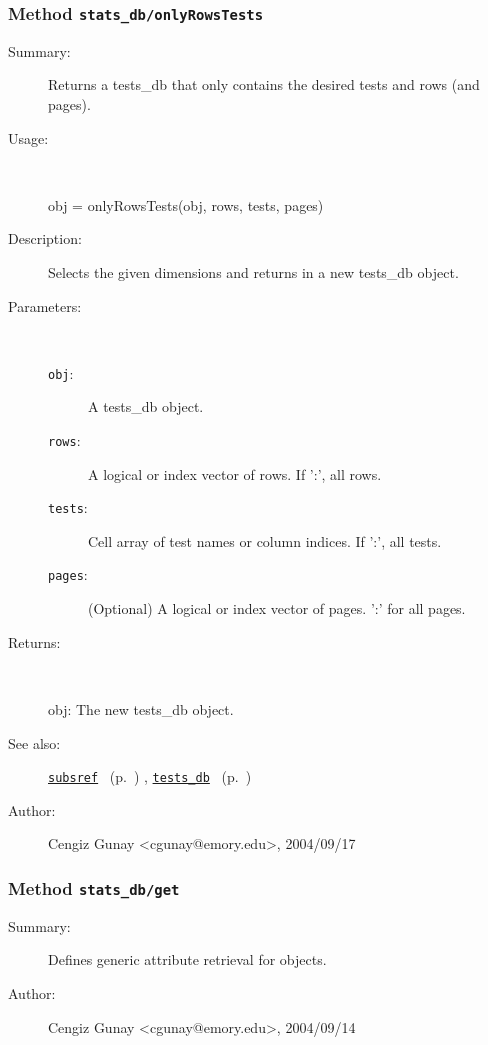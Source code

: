 \subsubsection[Method \texttt{onlyRowsTests}]{Method \texttt{stats\_db/onlyRowsTests}}%
%
\label{ref_stats_db__onlyRowsTests}%
\hypertarget{ref_stats_db__onlyRowsTests}{}%
\begin{description}
\item[Summary:]Returns a tests\_db that only contains the desired 
		tests and rows (and pages).
%
\item[Usage:]~%
\begin{lyxcode}%
obj = onlyRowsTests(obj, rows, tests, pages)
%
\end{lyxcode}%
%
\item[Description:]%
Selects the given dimensions and returns in a new tests\_db object.
\item[Parameters:]~
\begin{description}%
\item[\texttt{obj}:]
 A tests\_db object.
\item[\texttt{rows}:]
 A logical or index vector of rows. If ':', all rows.
\item[\texttt{tests}:]
 Cell array of test names or column indices. If ':', all tests.
\item[\texttt{pages}:]
 (Optional) A logical or index vector of pages. ':' for all pages.
\end{description}%
%
\item[Returns:]~

	obj: The new tests\_db object.
%
%
\item[See also:]%
\hyperlink{ref_subsref}{\texttt{subsref}}%
\ (p.~\pageref{ref_subsref})%
%
, \hyperlink{ref_tests_db}{\texttt{tests\_db}}%
\ (p.~\pageref{ref_tests_db})%
%
%
\item[Author:]%
Cengiz Gunay <cgunay@emory.edu>, 2004/09/17%
\end{description}
\methodline%
\subsubsection[Method \texttt{get}]{Method \texttt{stats\_db/get}}%
%
\label{ref_stats_db__get}%
\hypertarget{ref_stats_db__get}{}%
\begin{description}
\item[Summary:]Defines generic attribute retrieval for objects.
%
%
%
%
%
%
%
\item[Author:]%
Cengiz Gunay <cgunay@emory.edu>, 2004/09/14%
\end{description}
\methodline%
